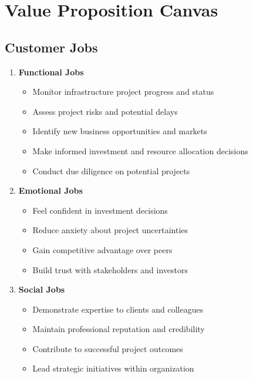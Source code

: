 \documentclass[business]{../templates/infraradar-main}
\begin{document}
\section{Value Proposition Canvas}

\subsection{Customer Jobs}
\begin{enumerate}
    \item \textbf{Functional Jobs}
    \begin{itemize}
        \item Monitor infrastructure project progress and status
        \item Assess project risks and potential delays
        \item Identify new business opportunities and markets
        \item Make informed investment and resource allocation decisions
        \item Conduct due diligence on potential projects
    \end{itemize}
    
    \item \textbf{Emotional Jobs}
    \begin{itemize}
        \item Feel confident in investment decisions
        \item Reduce anxiety about project uncertainties
        \item Gain competitive advantage over peers
        \item Build trust with stakeholders and investors
    \end{itemize}
    
    \item \textbf{Social Jobs}
    \begin{itemize}
        \item Demonstrate expertise to clients and colleagues
        \item Maintain professional reputation and credibility
        \item Contribute to successful project outcomes
        \item Lead strategic initiatives within organization
    \end{itemize}
\end{enumerate}
\end{document}
